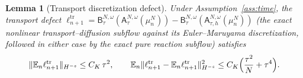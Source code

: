 \documentclass[a4paper,fleqn]{cas-sc}
\newtheorem{lemma}[theorem]{Lemma}
\theoremstyle{definition}
\theoremstyle{remark}
\begin{document}
\begin{lemma}[Transport discretization defect]\label{lem:transport}
Under Assumption~\ref{ass:time}, the transport defect
$\ell^{\mathrm{tr}}_{n+1}=\mathsf B^{N,\omega}_\tau(\mathsf A^{N,\omega}_\tau(\mu^N_n))
-\mathsf B^{N,\omega}_\tau(\mathsf A^{N,\omega}_{\tau,h}(\mu^N_n))$ (the exact
nonlinear transport--diffusion subflow against its Euler--Maruyama discretization,
followed in either case by the exact pure reaction subflow) satisfies
\begin{equation}\label{eq:transport}
\|\mathbb E_n\ell^{\mathrm{tr}}_{n+1}\|_{H^{-s}}\le C_K\,\tau^2,
\qquad
\mathbb E_n\|\ell^{\mathrm{tr}}_{n+1}-\mathbb E_n\ell^{\mathrm{tr}}_{n+1}\|_{H^{-s}}^2
\le C_K\Bigl(\frac{\tau^2}{N}+\tau^4\Bigr).
\end{equation}
\end{lemma}
\end{document}
